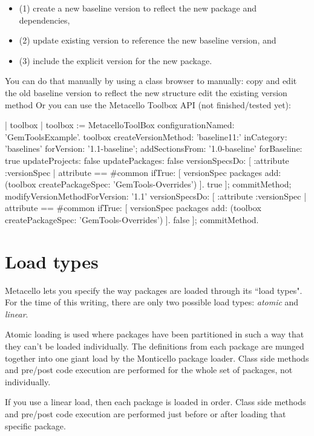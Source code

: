 \documentclass[a4paper,10pt,twoside]{book}
\begin{document}
\begin{itemize}
\item (1) create a new baseline version to reflect the new package and dependencies, 
\item (2) update existing  version to reference the new baseline version, and 
\item (3) include the explicit version for the new package.
\end{itemize}

You can do that manually by using a class browser to manually:
copy and edit the old baseline version to reflect the new structure
edit the existing  version method
Or you can use the Metacello Toolbox API (not finished/tested yet):

\begin{code}{}
| toolbox |
toolbox := MetacelloToolBox configurationNamed: 'GemToolsExample'.
toolbox
  createVersionMethod: 'baseline11:' inCategory: 'baselines' forVersion: '1.1-baseline';
  addSectionsFrom: '1.0-baseline'
     forBaseline: true
     updateProjects: false
     updatePackages: false
     versionSpecsDo: [ :attribute :versionSpec |
        attribute == #common
          ifTrue: [ versionSpec packages add: (toolbox createPackageSpec: 'GemTools-Overrides') ].
        true ];
  commitMethod;
  modifyVersionMethodForVersion: '1.1'
     versionSpecsDo: [ :attribute :versionSpec |
        attribute == #common
          ifTrue: [ versionSpec packages add: (toolbox createPackageSpec: 'GemTools-Overrides') ].
        false ];
  commitMethod.
\end{code}


\section{Load types}
Metacello lets you specify the way packages are loaded through its ``load types". For the time of this writing, there are only two possible load types: \emph{atomic} and \emph{linear}. 

Atomic loading is used where packages have been partitioned in such a way that they can't be loaded individually. The definitions from each package are munged together into one giant load by the Monticello package loader. Class side  methods and pre/post code execution are performed for the whole set of packages, not individually. 

If you use a linear load, then each package is loaded in order. Class side  methods and pre/post code execution are performed just before or after loading that specific package.
\end{document}
